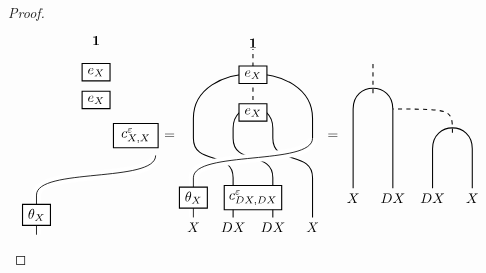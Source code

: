 \documentclass[11pt, reqno]{amsart}
\theoremstyle{definition}\newtheorem{defi}[thm]{Definition}
\theoremstyle{definition}\newtheorem{rem}[thm]{Remark}
\theoremstyle{definition}\newtheorem{exam}[thm]{Example}
\theoremstyle{definition}\newtheorem{assum}[thm]{Assumption}
\newcommand{\vac}{\mathbf{1}}
\begin{document}
\begin{proof}
\begin{align}
\begin{matrix}
\begin{tikzpicture}[scale = 1, baseline = {(current bounding box.center)}, line width=0.75pt]
     \draw[white, double=black, line width = 3pt ] (0,.5) -- (0,1.5) .. controls (0,2.2) and (3,1.8) .. (3,2.5);
      \node at (0,1) [draw,minimum width=20pt,minimum height=10pt,thick, fill=white] {$\theta_X$};
    \node at (2.5,3) [draw,minimum width=32pt,minimum height=10pt,thick, fill=white] {$c_{X,X}^{\varepsilon}$};
     \node at (1.5,3.9) [draw,minimum width=20pt,minimum height=10pt,thick, fill=white] {$e_X$};
      \node at (1.5,4.6) [draw,minimum width=20pt,minimum height=10pt,thick, fill=white] {$e_X$};
     \node at (1.5,5.4) {$\vac$};
    \end{tikzpicture}
    \end{matrix} & =
    \begin{matrix}
    \begin{tikzpicture}[scale = 1, baseline = {(current bounding box.center)}, line width=0.75pt]
    \node at (0,1.25) {$X$};
    \node at (1,1.25) {$DX$};
    \node at (2,1.25) {$DX$}; 
    \node at (3,1.25) {$X$};
    \draw[dashed] (1.5,4.25) -- (1.5,5.75);
  \draw (2,1.5) -- (2,2.5) .. controls (2,3.2) and (1,2.8) .. (1,3.5) -- (1,3.75) .. controls (1,4.45) and (2,4.45) .. (2,3.75) -- (2,3.5) .. controls (2,2.8) and (3,3.2) .. (3,2.5) -- (3,1.5);
    \draw (1,1.5) -- (1,2.5) .. controls (1,3.2) and (0,2.8) .. (0,3.5) -- (0,4) .. controls (0,5.5) and (3,5.5) .. (3,4) -- (3,3.5);
     \draw[white, double=black, line width = 3pt ] (0,1.5) -- (0,2.5) .. controls (0,3.2) and (3,2.8) .. (3,3.5);
    \node at (1.5,2) [draw,minimum width=32pt,minimum height=10pt,thick, fill=white] {$c_{DX,DX}^{\varepsilon}$};
        \node at (0,2) [draw,minimum width=20pt,minimum height=10pt,thick, fill=white] {$\theta_X$};
     \node at (1.5,4.15) [draw,minimum width=20pt,minimum height=10pt,thick, fill=white] {$e_X$};
      \node at (1.5,5.1) [draw,minimum width=20pt,minimum height=10pt,thick, fill=white] {$e_X$};
     \node at (1.5,5.9) {$\vac$};
    \end{tikzpicture}
    \end{matrix} =
    \begin{matrix}
    \begin{tikzpicture}[scale = 1, baseline = {(current bounding box.center)}, line width=0.75pt]
    \node at (0,1.25) {$X$};
    \node at (1,1.25) {$DX$};
    \node at (2,1.25) {$DX$}; 
    \node at (3,1.25) {$X$};
    \draw[dashed] (.5,3.9) -- (.5,4.65);
    \draw[dashed] (2.5,2.9) .. controls (2.5,3.5) .. (1,3.5);
  \draw (2,1.5) -- (2,2.5) .. controls (2,3.2) and (3,3.2) .. (3,2.5) -- (3,1.5);
    \draw (1,1.5) -- (1,3.5) .. controls (1,4.2) and (0,4.2) .. (0,3.5) -- (0,1.5);

\end{tikzpicture}
\end{matrix}
\end{align}
\end{proof}
\end{document}
